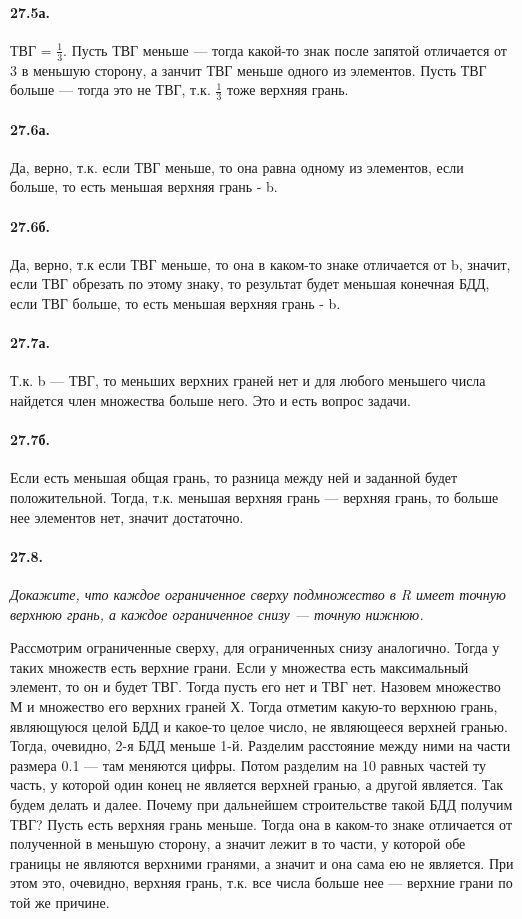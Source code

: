 \documentclass{book}
\begin{document}
\paragraph{27.5а.}
ТВГ = $\frac{1}{3}$. Пусть ТВГ меньше — тогда какой-то знак после запятой отличается от 3 в меньшую сторону, а занчит ТВГ меньше одного из элементов. Пусть ТВГ больше — тогда это не ТВГ, т.к. $\frac{1}{3}$ тоже верхняя грань.

\paragraph{27.6а.}
Да, верно, т.к. если ТВГ меньше, то она равна одному из элементов, если больше, то есть меньшая верхняя грань - b. 

\paragraph{27.6б.}
Да, верно, т.к если ТВГ меньше, то она в каком-то знаке отличается от b, значит, если ТВГ  обрезать по этому знаку, то результат будет меньшая конечная БДД, если ТВГ больше, то есть меньшая верхняя грань - b.

\paragraph{27.7а.}
Т.к. b — ТВГ, то меньших верхних граней нет и для любого меньшего числа найдется член множества больше него. Это и есть вопрос задачи.

\paragraph{27.7б.}
Если есть меньшая общая грань, то разница между ней и заданной будет положительной. Тогда, т.к. меньшая верхняя грань — верхняя грань, то больше нее элементов нет, значит достаточно.

\paragraph{27.8.}
\textit{Докажите, что каждое ограниченное сверху подмножество в R имеет точную верхнюю грань, а каждое ограниченное снизу — точную нижнюю.}

Рассмотрим ограниченные сверху, для ограниченных снизу аналогично. Тогда у таких множеств есть верхние грани. Если у множества есть максимальный элемент, то он и будет ТВГ. Тогда пусть его нет и ТВГ нет. Назовем множество М и множество его верхних граней Х. Тогда отметим какую-то верхнюю грань, являющуюся целой БДД и какое-то целое число, не являющееся верхней гранью. Тогда, очевидно, 2-я БДД меньше 1-й. Разделим расстояние между ними на части размера 0.1 — там меняются цифры. Потом разделим на 10 равных частей ту часть, у которой один конец не является верхней гранью, а другой является. Так будем делать и далее. Почему при дальнейшем строительстве такой БДД получим ТВГ? Пусть есть верхняя грань меньше. Тогда она в каком-то знаке отличается от полученной в меньшую сторону, а значит лежит в то части, у которой обе границы не являются верхними гранями, а значит и она сама ею не является. При этом это, очевидно, верхняя грань, т.к. все числа больше нее — верхние грани по той же причине. 
\end{document}
